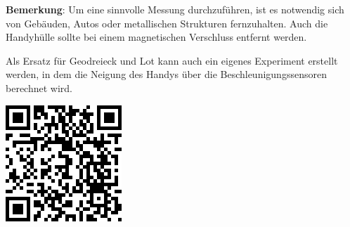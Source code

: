 \documentclass[../main.tex]{subfiles}
\begin{document}
\begin{tcolorbox}
\vspace{0.5cm}
    \textbf{Bemerkung}: Um eine sinnvolle Messung durchzuführen, ist es notwendig sich von Gebäuden, Autos oder metallischen Strukturen fernzuhalten. Auch die Handyhülle sollte bei einem magnetischen Verschluss entfernt werden.\\
    \begin{minipage}[]{0.85\textwidth}
            Als Ersatz für Geodreieck und Lot kann auch ein eigenes Experiment erstellt werden, in dem die Neigung des Handys über die Beschleunigungssensoren berechnet wird.
  
        \end{minipage}
        \hspace{0.3cm}
        \begin{minipage}[]{0.1\textwidth}
            \includegraphics[width=\textwidth]{img/qr_code}
        \end{minipage}

    
\end{tcolorbox}
\end{document}
